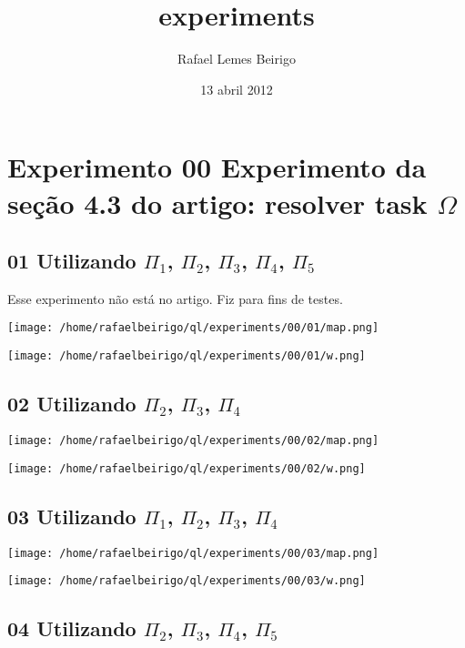 \documentclass[11pt]{article}
\title{experiments}
\author{Rafael Lemes Beirigo}
\date{13 abril 2012}
\begin{document}
\maketitle

\setcounter{tocdepth}{3}
\tableofcontents
\vspace*{1cm}
\section{Experimento 00 Experimento da seção 4.3 do artigo: resolver task $\Omega$}
\label{sec-1}

\subsection{01 Utilizando $\Pi$$_1$, $\Pi$$_2$, $\Pi$$_3$, $\Pi$$_4$, $\Pi$$_5$}
\label{sec-1.1}

Esse experimento não está no artigo. Fiz para fins de testes.

\centerline{\texttt{[image: /home/rafaelbeirigo/ql/experiments/00/01/map.png]}}


\centerline{\texttt{[image: /home/rafaelbeirigo/ql/experiments/00/01/w.png]}}


\subsection{02 Utilizando $\Pi$$_2$, $\Pi$$_3$, $\Pi$$_4$}
\label{sec-1.2}

\centerline{\texttt{[image: /home/rafaelbeirigo/ql/experiments/00/02/map.png]}}


\centerline{\texttt{[image: /home/rafaelbeirigo/ql/experiments/00/02/w.png]}}


\subsection{03 Utilizando $\Pi$$_1$, $\Pi$$_2$, $\Pi$$_3$, $\Pi$$_4$}
\label{sec-1.3}

\centerline{\texttt{[image: /home/rafaelbeirigo/ql/experiments/00/03/map.png]}}


\centerline{\texttt{[image: /home/rafaelbeirigo/ql/experiments/00/03/w.png]}}


\subsection{04 Utilizando $\Pi$$_2$, $\Pi$$_3$, $\Pi$$_4$, $\Pi$$_5$}
\label{sec-1.4}
\end{document}
